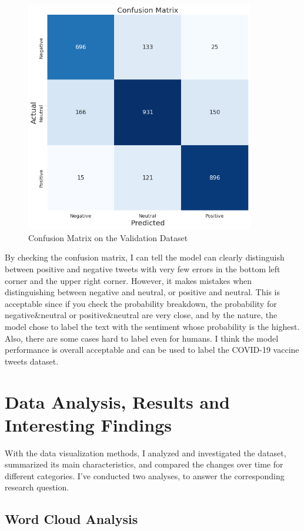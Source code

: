 \documentclass{article}
\begin{document}
\begin{figure}[H]
\centering
\includegraphics[width=10cm]{confusion_matrix.png}
\caption{Confusion Matrix on the Validation Dataset}
\end{figure}

By checking the confusion matrix, I can tell the model can clearly distinguish between positive and negative tweets with very few errors in the bottom left corner and the upper right corner. However, it makes mistakes when distinguishing between negative and neutral, or positive and neutral. This is acceptable since if you check the probability breakdown, the probability for negative\&neutral or positive\&neutral are very close, and by the nature, the model chose to label the text with the sentiment whose probability is the highest. Also, there are some cases hard to label even for humans. I think the model performance is overall acceptable and can be used to label the COVID-19 vaccine tweets dataset.

\section{Data Analysis, Results and Interesting Findings}

With the data visualization methods, I analyzed and investigated the dataset, summarized its main characteristics, and compared the changes over time for different categories. I've conducted two analyses, to answer the corresponding research question.

\subsection{Word Cloud Analysis}
\end{document}
